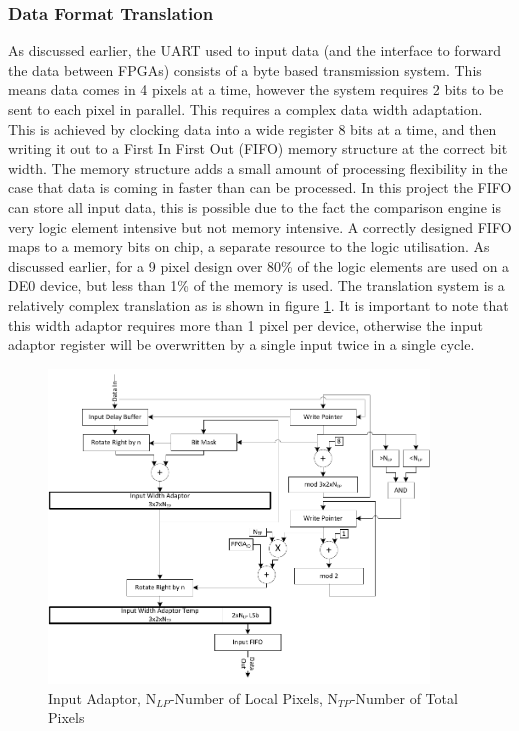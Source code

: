 \subsubsection{Data Format Translation}
As discussed earlier, the UART used to input data (and the interface to forward the data between FPGAs) consists of a byte based transmission system. This means data comes in 4 pixels at a time, however the system requires 2 bits to be sent to each pixel in parallel. This requires a complex data width adaptation. This is achieved by clocking data into a wide register 8 bits at a time, and then writing it out to a First In First Out (FIFO) memory structure at the correct bit width. The memory structure adds a small amount of processing flexibility in the case that data is coming in faster than can be processed. In this project the FIFO can store all input data, this is possible due to the fact the comparison engine is very logic element intensive but not memory intensive. A correctly designed FIFO maps to a memory bits on chip, a separate resource to the logic utilisation. As discussed earlier, for a 9 pixel design over 80\% of the logic elements are used on a DE0 device, but less than 1\% of the memory is used. The translation system is a relatively complex translation as is shown in figure \ref{fig:translator}. It is important to note that this width adaptor requires more than 1 pixel per device, otherwise the input adaptor register will be overwritten by a single input twice in a single cycle.

\begin{figure}[!h]
  \centering
  \includegraphics[width=0.9\textwidth]{./figs/input_adaptor.pdf}
  \caption{Input Adaptor, N$_{LP}$-Number of Local Pixels, N$_{TP}$-Number of Total Pixels}
  \label{fig:translator}
\end{figure}



